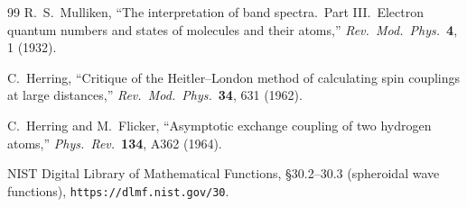 \documentclass[aps,pra,twocolumn,superscriptaddress,longbibliography]{revtex4-2}
\begin{document}
\begin{thebibliography}{99}
R.~S.~Mulliken, ``The interpretation of band spectra.\ Part III.\ Electron
quantum numbers and states of molecules and their atoms,''
\textit{Rev.\ Mod.\ Phys.}\ \textbf{4}, 1 (1932).

C.~Herring, ``Critique of the Heitler--London method of calculating spin
couplings at large distances,''
\textit{Rev.\ Mod.\ Phys.}\ \textbf{34}, 631 (1962).

C.~Herring and M.~Flicker, ``Asymptotic exchange coupling of two hydrogen
atoms,'' \textit{Phys.\ Rev.}\ \textbf{134}, A362 (1964).

NIST Digital Library of Mathematical Functions, \S30.2--30.3
(spheroidal wave functions), \texttt{https://dlmf.nist.gov/30}.

\end{thebibliography}
\end{document}
